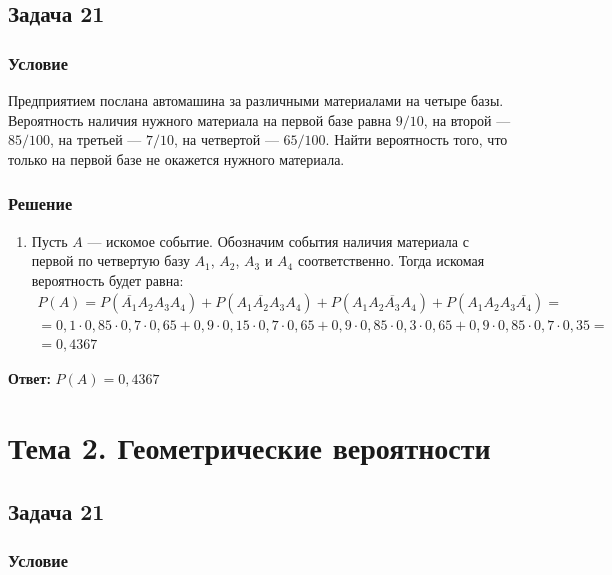 \documentclass[14pt]{article}
\begin{document}
    \subsection*{Задача 21}
    \subsubsection*{Условие}

    Предприятием послана автомашина за различными материалами на четыре базы.
    Вероятность наличия нужного материала на первой базе равна $9/10$, на второй --- $85/100$, на третьей --- $7/10$, на четвертой --- $65/100$.
    Найти вероятность того, что только на первой базе не окажется нужного материала.

    \subsubsection*{Решение}

    \begin{enumerate}[wide, labelwidth=!, labelindent=0pt]
        \item Пусть $A$ --- искомое событие. Обозначим события наличия материала с первой по четвертую базу $A_1$, $A_2$, $A_3$ и $A_4$ соответственно.
        Тогда искомая вероятность будет равна:
        \begin{gather*}
            P(A) = P(\overline{A_1} A_2 A_3 A_4) + P(A_1 \overline{A_2} A_3 A_4) + P(A_1 A_2 \overline{A_3} A_4) + P(A_1 A_2 A_3 \overline{A_4}) =\\
            = 0,1 \cdot 0,85 \cdot 0,7 \cdot 0,65 + 0,9 \cdot 0,15 \cdot 0,7 \cdot 0,65 + 0,9 \cdot 0,85 \cdot 0,3 \cdot 0,65 + 0,9 \cdot 0,85 \cdot 0,7 \cdot 0,35 =\\
            = 0,4367
        \end{gather*}
    \end{enumerate}
    \hspace{290pt}\textbf{Ответ:} $P(A) = 0,4367$

    \newpage

    \section*{Тема 2. Геометрические вероятности}

    \subsection*{Задача 21}
    \subsubsection*{Условие}
\end{document}
